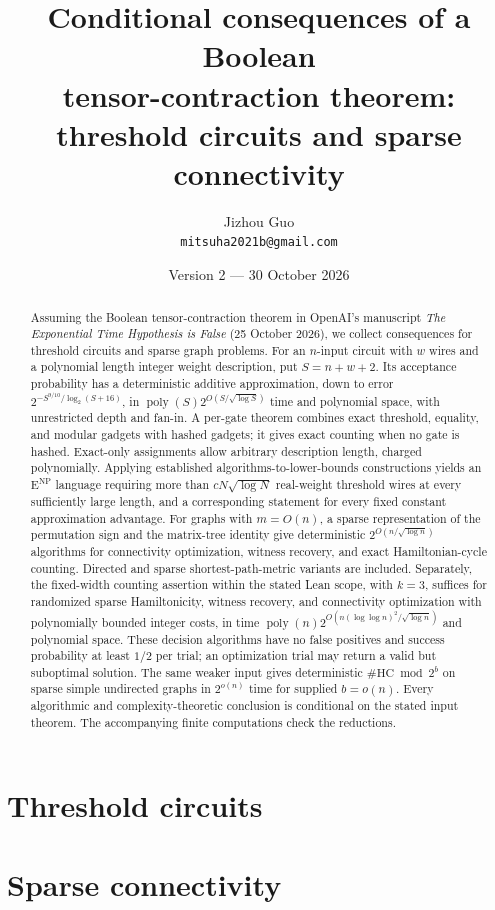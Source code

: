 \documentclass[11pt,a4paper]{article}
\title{Conditional consequences of a Boolean\\ tensor-contraction theorem:\\ threshold circuits and sparse connectivity}
\author{Jizhou Guo\\\texttt{mitsuha2021b@gmail.com}}
\date{Version 2 --- 30 October 2026}
\numberwithin{equation}{section}
\theoremstyle{definition}
\theoremstyle{remark}
\newcommand{\poly}{\operatorname{poly}}
\newcommand{\ENP}{\mathrm{E}^{\mathrm{NP}}}
\begin{document}
\maketitle
\begin{abstract}
Assuming the Boolean tensor-contraction theorem in OpenAI's manuscript
\emph{The Exponential Time Hypothesis is False} (25 October 2026), we collect
consequences for threshold circuits and sparse graph problems.
For an $n$-input circuit with $w$ wires and a polynomial length integer
weight description, put $S=n+w+2$. Its acceptance probability has a
deterministic additive approximation, down to error
$2^{-S^{9/10}/\log_2(S+16)}$, in
$\poly(S)2^{O(S/\sqrt{\log S})}$ time and polynomial space, with unrestricted
depth and fan-in. A per-gate theorem combines exact threshold, equality,
and modular gadgets with hashed gadgets; it gives exact counting when
no gate is hashed. Exact-only assignments allow arbitrary description
length, charged polynomially. Applying established algorithms-to-lower-bounds
constructions yields an $\ENP$ language requiring more than
$cN\sqrt{\log N}$ real-weight threshold wires at every sufficiently large
length, and a corresponding statement for every fixed constant
approximation advantage. For graphs with $m=O(n)$, a sparse representation
of the permutation sign and the matrix-tree identity give deterministic
$2^{O(n/\sqrt{\log n})}$ algorithms for connectivity optimization, witness
recovery, and exact Hamiltonian-cycle counting. Directed and sparse
shortest-path-metric variants are included. Separately, the fixed-width
counting assertion within the stated Lean scope, with $k=3$, suffices for
randomized sparse Hamiltonicity, witness recovery, and connectivity
optimization with polynomially bounded integer costs, in time
$\poly(n)2^{O(n(\log\log n)^2/\sqrt{\log n})}$ and polynomial space.
These decision algorithms have no false positives and success probability
at least $1/2$ per trial; an optimization trial may return a valid but
suboptimal solution. The same weaker input gives deterministic
$\#\mathrm{HC}\bmod 2^b$ on sparse simple undirected graphs in $2^{o(n)}$ time for supplied $b=o(n)$.
Every algorithmic and
complexity-theoretic conclusion is conditional on the stated input
theorem. The accompanying finite computations check the reductions.
\end{abstract}
\tableofcontents


\part{Threshold circuits}



\part{Sparse connectivity}





\begingroup
\small
\raggedright


\endgroup
\end{document}
